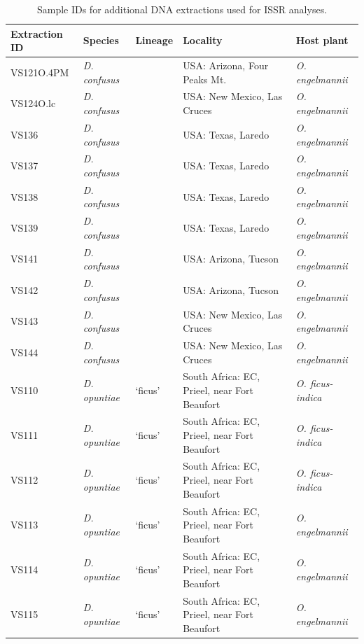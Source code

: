 \begin{landscape}
\begin{table}[H]
\centering
\caption{Sample IDs for additional DNA extractions used for ISSR analyses.}
\label{appendix:issr_sample_table}
{\scriptsize %
\renewcommand{\arraystretch}{0.5}
\begin{tabular}{@{}lllll@{}}
\toprule
\textbf{Extraction ID} & \textbf{Species} & \textbf{Lineage} & \textbf{Locality} & \textbf{Host plant} \\ \midrule
VS121O.4PM & \textit{D. confusus} &  & USA: Arizona, Four Peaks Mt. & \textit{O. engelmannii} \\
VS124O.lc & \textit{D. confusus} &  & USA: New Mexico, Las Cruces & \textit{O. engelmannii} \\
VS136 & \textit{D. confusus} &  & USA: Texas, Laredo & \textit{O. engelmannii} \\
VS137 & \textit{D. confusus} &  & USA: Texas, Laredo & \textit{O. engelmannii} \\
VS138 & \textit{D. confusus} &  & USA: Texas, Laredo & \textit{O. engelmannii} \\
VS139 & \textit{D. confusus} &  & USA: Texas, Laredo & \textit{O. engelmannii} \\
VS141 & \textit{D. confusus} &  & USA: Arizona, Tucson & \textit{O. engelmannii} \\
VS142 & \textit{D. confusus} &  & USA: Arizona, Tucson & \textit{O. engelmannii} \\
VS143 & \textit{D. confusus} &  & USA: New Mexico, Las Cruces & \textit{O. engelmannii} \\
VS144 & \textit{D. confusus} &  & USA: New Mexico, Las Cruces & \textit{O. engelmannii} \\
VS110 & \textit{D. opuntiae} & `ficus' & South Africa: EC, Prieel, near Fort Beaufort & \textit{O. ficus-indica} \\
VS111 & \textit{D. opuntiae} & `ficus' & South Africa: EC, Prieel, near Fort Beaufort & \textit{O. ficus-indica} \\
VS112 & \textit{D. opuntiae} & `ficus' & South Africa: EC, Prieel, near Fort Beaufort & \textit{O. ficus-indica} \\
VS113 & \textit{D. opuntiae} & `ficus' & South Africa: EC, Prieel, near Fort Beaufort & \textit{O. engelmannii} \\
VS114 & \textit{D. opuntiae} & `ficus' & South Africa: EC, Prieel, near Fort Beaufort & \textit{O. engelmannii} \\
VS115 & \textit{D. opuntiae} & `ficus' & South Africa: EC, Prieel, near Fort Beaufort & \textit{O. engelmannii} \\

\end{tabular}}
\end{table}
\end{landscape}
